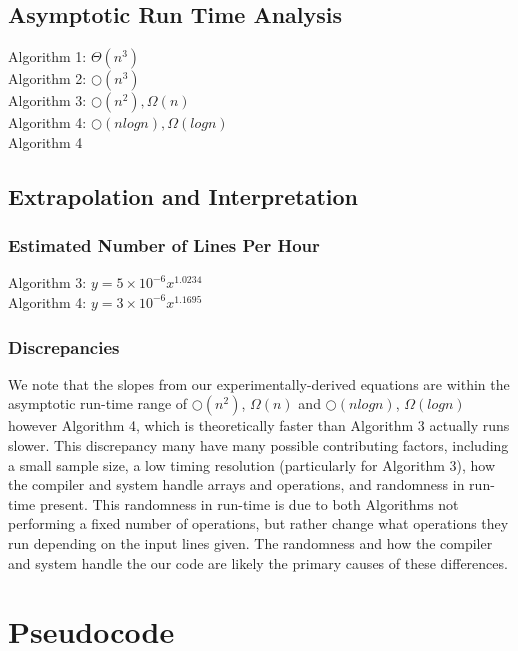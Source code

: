 \documentclass{article}
\begin{document}
\subsection*{Asymptotic Run Time Analysis}
Algorithm 1: $\Theta(n^3)$\\
Algorithm 2: $\bigcirc(n^3)$\\
Algorithm 3: $\bigcirc(n^2),\Omega(n)$\\
Algorithm 4: $\bigcirc(nlogn),\Omega(logn)$\\
\indent Algorithm 4 

\subsection*{Extrapolation and Interpretation}
\subsubsection*{Estimated Number of Lines Per Hour}
Algorithm 3: $y=5 \times 10^{-6}x^{1.0234}$\\
Algorithm 4: $y=3 \times 10^{-6}x^{1.1695}$

\subsubsection*{Discrepancies}

We note that the slopes from our experimentally-derived equations are within the asymptotic run-time range of $\bigcirc(n^2)$, $\Omega(n)$ and $\bigcirc(nlogn)$, $\Omega(logn)$ however Algorithm 4, which is theoretically faster than Algorithm 3 actually runs slower. This discrepancy many have many possible contributing factors, including a small sample size, a low timing resolution (particularly for Algorithm 3), how the compiler and system handle arrays and operations, and randomness in run-time present. This randomness in run-time is due to both Algorithms not performing a fixed number of operations, but rather change what operations they run depending on the input lines given. The randomness and how the compiler and system handle the our code are likely the primary causes of these differences.

\pagebreak

\section*{Pseudocode}

\end{document}

